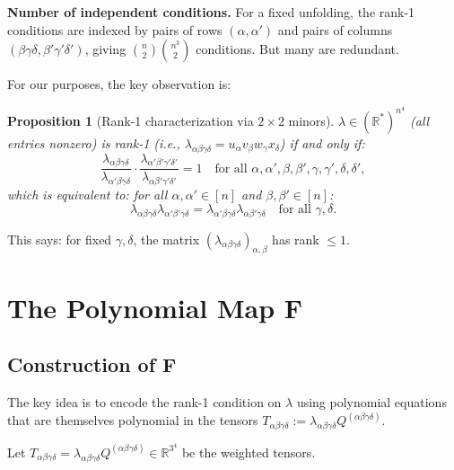 \documentclass[12pt]{article}
\newtheorem{proposition}[theorem]{Proposition}
\begin{document}
\textbf{Number of independent conditions.} For a fixed unfolding, the rank-1 conditions are indexed by pairs of rows $(\alpha, \alpha')$ and pairs of columns $(\beta\gamma\delta, \beta'\gamma'\delta')$, giving $\binom{n}{2} \binom{n^3}{2}$ conditions. But many are redundant.

For our purposes, the key observation is:

\begin{proposition}[Rank-1 characterization via $2 \times 2$ minors]\label{prop:rank1}
$\lambda \in (\mathbb{R}^*)^{n^4}$ (all entries nonzero) is rank-1 (i.e., $\lambda_{\alpha\beta\gamma\delta} = u_\alpha v_\beta w_\gamma x_\delta$) if and only if:
\begin{equation}\label{eq:rank1-cond}
\frac{\lambda_{\alpha\beta\gamma\delta}}{\lambda_{\alpha'\beta\gamma\delta}} \cdot \frac{\lambda_{\alpha'\beta'\gamma'\delta'}}{\lambda_{\alpha\beta'\gamma'\delta'}} = 1 \quad \text{for all } \alpha,\alpha',\beta,\beta',\gamma,\gamma',\delta,\delta',
\end{equation}
which is equivalent to: for all $\alpha,\alpha' \in [n]$ and $\beta,\beta' \in [n]$:
\begin{equation}\label{eq:log-rank1}
\lambda_{\alpha\beta\gamma\delta}\lambda_{\alpha'\beta'\gamma\delta} = \lambda_{\alpha'\beta\gamma\delta}\lambda_{\alpha\beta'\gamma\delta} \quad \text{for all } \gamma,\delta.
\end{equation}
\end{proposition}

This says: for fixed $\gamma, \delta$, the matrix $(\lambda_{\alpha\beta\gamma\delta})_{\alpha,\beta}$ has rank $\leq 1$.

\section{The Polynomial Map $\mathbf{F}$}

\subsection{Construction of $\mathbf{F}$}

The key idea is to encode the rank-1 condition on $\lambda$ using polynomial equations that are themselves polynomial in the tensors $T_{\alpha\beta\gamma\delta} := \lambda_{\alpha\beta\gamma\delta} Q^{(\alpha\beta\gamma\delta)}$.

Let $T_{\alpha\beta\gamma\delta} = \lambda_{\alpha\beta\gamma\delta} Q^{(\alpha\beta\gamma\delta)} \in \mathbb{R}^{3^4}$ be the weighted tensors.
\end{document}
